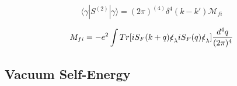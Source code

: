 \documentclass[a4]{article}
\begin{document}
        \begin{framed}

            \begin{equation}
                \langle \gamma | S^{(2)} | \gamma \rangle = (2 \pi)^{(4)} \delta^4 (k - k') \mathcal{M}_{fi}
            \end{equation}

            \begin{equation}
                M_{fi} = - e^{2} \int Tr [i S_{F} (k + q) \slashed{\epsilon}_{\lambda} i S_{F} (q) \slashed{\epsilon}_{\lambda}] \frac{d^4 q}{(2 \pi)^4}
            \end{equation}

        \end{framed}

        \subsection{Vacuum Self-Energy}
\end{document}
